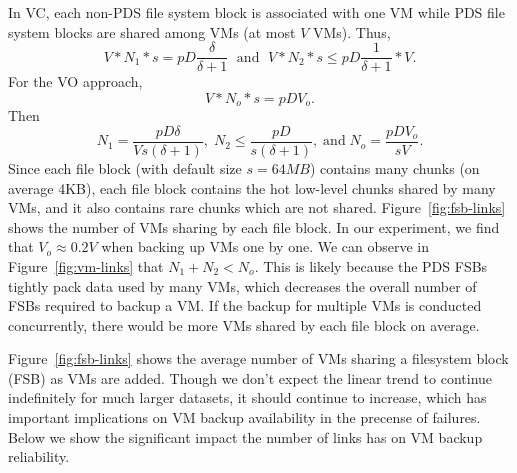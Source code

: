 In VC, each non-PDS file system block is associated with one VM while PDS file system blocks are
shared among VMs  (at most $V$ VMs). Thus, 
\[
V *N_1 *s  = pD  \frac{\delta} {\delta +1} \; \mbox{ and } \; 
V *N_2 *s  \leq pD  \frac{1} {\delta +1} *V.
\]
For the VO approach, 
\[
V *N_o *s  = pD  V_o.
\]
Then
\[
N_1= \frac{pD \delta} {V s (\delta +1)},\; 
N_2 \leq \frac{pD } {s (\delta +1)}, \; 
\mbox{and} \; N_o = \frac{pD V_o } {s V}.
\]
Since each file block (with default size $s=64MB$) contains many chunks (on average 4KB),
each file block contains the hot low-level chunks shared by many VMs, and it also contains
rare chunks which are not shared.
Figure~\ref{fig:fsb-links} shows the number of VMs sharing by each file block.
In our experiment, we find that $V_o \approx 0.2 V$ when backing up VMs one by one.
We can observe in Figure~\ref{fig:vm-links} that $N_1 +N_2 < N_o$. This is likely because the PDS FSBs tightly pack data used by many VMs, which decreases the overall number of FSBs required to backup a VM.
If  the backup for multiple VMs is conducted concurrently, there would be more
VMs shared  by each file block on average.

Figure~\ref{fig:fsb-links} shows the average number of VMs sharing a
filesystem block (FSB) as VMs are added. Though we don't expect the linear trend to continue indefinitely for
much larger datasets, it should continue to increase, which has important implications
on VM backup availability in the precense of failures. Below we show the
significant impact the number of links has on VM backup reliability.


